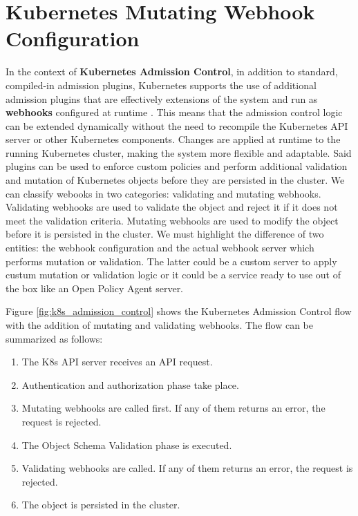 \newpage

\section{Kubernetes Mutating Webhook Configuration}

In the context of \textbf{Kubernetes Admission Control}, in addition to standard, compiled-in admission plugins, Kubernetes supports the use of additional admission plugins that are effectively extensions of the system and run as \textbf{webhooks} configured at runtime \cite{kubernetes_dynamic_admission_control}. 
This means that the admission control logic can be extended dynamically without the need to recompile the Kubernetes API server or other Kubernetes components. 
Changes are applied at runtime to the running Kubernetes cluster, making the system more flexible and adaptable.
Said plugins can be used to enforce custom policies and perform additional validation and mutation of Kubernetes objects before they are persisted in the cluster.
We can classify webooks in two categories: validating and mutating webhooks.
Validating webhooks are used to validate the object and reject it if it does not meet the validation criteria.
Mutating webhooks are used to modify the object before it is persisted in the cluster.
We must highlight the difference of two entities: the webhook configuration and the actual webhook server which performs mutation or validation.
The latter could be a custom server to apply custum mutation or validation logic or it could be a service ready to use out of the box like an Open Policy Agent server.

Figure \ref{fig:k8s_admission_control} shows the Kubernetes Admission Control flow with the addition of mutating and validating webhooks.
The flow can be summarized as follows:
\begin{enumerate}[itemsep=0.2pt, topsep=1pt]
  \item The K8s API server receives an API request.
  \item Authentication and authorization phase take place.
  \item Mutating webhooks are called first. If any of them returns an error, the request is rejected.
  \item The Object Schema Validation phase is executed.
  \item Validating webhooks are called. If any of them returns an error, the request is rejected.
  \item The object is persisted in the cluster.
\end{enumerate}

